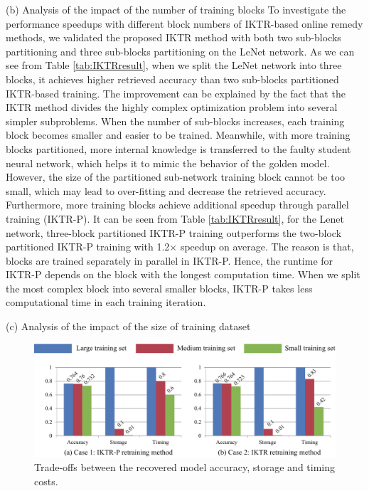 (b) Analysis of the impact of the number of training blocks
To investigate the performance speedups with different block numbers of IKTR-based online remedy methods, we validated the proposed IKTR method with both two sub-blocks partitioning and three sub-blocks partitioning on the LeNet network. As we can see from Table \ref{tab:IKTRresult}, when we split the LeNet network into three blocks, it achieves higher retrieved accuracy than two sub-blocks partitioned IKTR-based training. The improvement can be explained by the fact that the IKTR method divides the highly complex optimization problem into several simpler subproblems. When the number of sub-blocks increases, each training block becomes smaller and easier to be trained. Meanwhile, with more training blocks partitioned, more internal knowledge is transferred to the faulty student neural network, which helps it to mimic the behavior of the golden model. However, the size of the partitioned sub-network training block cannot be too small, which may lead to over-fitting and decrease the retrieved accuracy. Furthermore, more training blocks achieve additional speedup through parallel training (IKTR-P). It can be seen from Table \ref{tab:IKTRresult}, for the Lenet network, three-block partitioned IKTR-P training outperforms the two-block partitioned IKTR-P training with 1.2$\times$ speedup on average. The reason is that, blocks are trained separately in parallel in IKTR-P. Hence, the runtime for IKTR-P depends on the block with the longest computation time. When we split the most complex block into several smaller blocks, IKTR-P takes less computational time in each training iteration.



(c) Analysis of the impact of the size of training dataset
\begin{figure}
    \centering
    \includegraphics[width=0.85\linewidth]{images/OL-fig17}
    \caption{Trade-offs between the recovered model accuracy, storage and timing costs.}
    \label{fig:differenttrainingset}
    \vspace{-20pt}
\end{figure}

